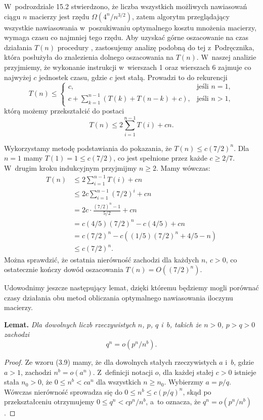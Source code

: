 
\exercise %
W~podrozdziale 15.2 stwierdzono, że liczba wszystkich możliwych nawiasowań ciągu $n$ macierzy jest rzędu $\Omega(4^n\!/n^{3/2})$, zatem algorytm przeglądający wszystkie nawiasowania w~poszukiwaniu optymalnego kosztu mnożenia macierzy, wymaga czasu co najmniej tego rzędu.
Aby uzyskać górne oszacowanie na czas działania $T(n)$ procedury , zastosujemy analizę podobną do tej z~Podręcznika, która posłużyła do znalezienia dolnego oszacowania na $T(n)$.
W~naszej analizie przyjmiemy, że wykonanie instrukcji w~wierszach 1 oraz wierszach 6 zajmuje co najwyżej $c$ jednostek czasu, gdzie $c$ jest stałą.
Prowadzi to do rekurencji
\[
	T(n) \le \begin{cases}
		c, & \text{jeśli $n=1$}, \\
		c+\displaystyle\sum_{k=1}^{n-1}(T(k)+T(n-k)+c), & \text{jeśli $n>1$},
	\end{cases}
\]
którą możemy przekształcić do postaci
\[
	T(n) \le 2\sum_{i=1}^{n-1}T(i)+cn.
\]

Wykorzystamy metodę podstawiania do pokazania, że $T(n)\le c(7/2)^n$.
Dla $n=1$ mamy $T(1)=1\le c(7/2)$, co jest spełnione przez każde $c\ge2/7$.
W~drugim kroku indukcyjnym przyjmijmy $n\ge2$.
Mamy wówczas:
\begin{align*}
	T(n) &\le 2\sum_{i=1}^{n-1}T(i)+cn \\
	&\le 2c\sum_{i=1}^{n-1}(7/2)^i+cn \\
	&= 2c\cdot\frac{(7/2)^n-1}{5/2}+cn \\
	&= c(4/5)(7/2)^n-c(4/5)+cn \\
	&= c(7/2)^n-c((1/5)(7/2)^n+4/5-n) \\
	&\le c(7/2)^n.
\end{align*}
Można sprawdzić, że ostatnia nierówność zachodzi dla każdych $n$, $c>0$, co ostatecznie kończy dowód oszacowania $T(n)=O((7/2)^n)$.

Udowodnimy jeszcze następujący lemat, dzięki któremu będziemy mogli porównać czasy działania obu metod obliczania optymalnego nawiasowania iloczynu macierzy.

\medskip
\noindent\textsf{\textbf{Lemat.}} \textit{Dla dowolnych liczb rzeczywistych\/ $n$, $p$, $q$ i\/~$b$, takich że\/ $n>0$,\/ $p>q>0$ zachodzi}
\[
	q^n = o(p^n\!/n^b).
\]
\begin{proof}
Ze wzoru (3.9) mamy, że dla dowolnych stałych rzeczywistych $a$ i~$b$, gdzie $a>1$, zachodzi $n^b=o(a^n)$.
Z~definicji notacji $o$, dla każdej stałej $c>0$ istnieje stała $n_0>0$, że $0\le n^b<ca^n$ dla wszystkich $n\ge n_0$.
Wybierzmy $a=p/q$.
Wówczas nierówność sprowadza się do $0\le n^b\le c(p/q)^n$, skąd po przekształceniu otrzymujemy $0\le q^n<cp^n\!/n^b$, a~to oznacza, że $q^n=o(p^n\!/n^b)$.
\end{proof}

